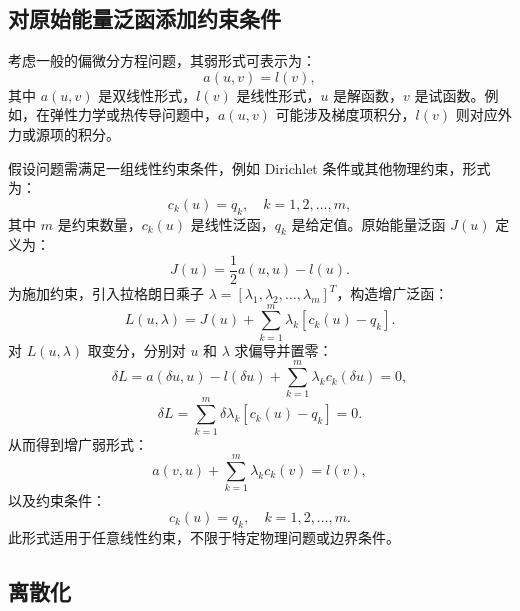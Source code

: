 \documentclass[engineeringmaster]{hquThesis}
\begin{document}
\subsection*{对原始能量泛函添加约束条件}

考虑一般的偏微分方程问题，其弱形式可表示为：
\begin{equation}
a(u, v) = l(v),
\label{eq:weak_form_general}
\end{equation}
其中 \( a(u, v) \) 是双线性形式，\( l(v) \) 是线性形式，\( u \) 是解函数，\( v \) 是试函数。例如，在弹性力学或热传导问题中，\( a(u, v) \) 可能涉及梯度项积分，\( l(v) \) 则对应外力或源项的积分。

假设问题需满足一组线性约束条件，例如 Dirichlet 条件或其他物理约束，形式为：
\begin{equation}
c_k(u) = q_k, \quad k = 1, 2, \ldots, m,
\label{eq:general_constraints}
\end{equation}
其中 \( m \) 是约束数量，\( c_k(u) \) 是线性泛函，\( q_k \) 是给定值。原始能量泛函 \( J(u) \) 定义为：
\begin{equation}
J(u) = \frac{1}{2} a(u, u) - l(u).
\label{eq:energy_functional_general}
\end{equation}
为施加约束，引入拉格朗日乘子 \( \lambda = [\lambda_1, \lambda_2, \ldots, \lambda_m]^T \)，构造增广泛函：
\begin{equation}
L(u, \lambda) = J(u) + \sum_{k=1}^m \lambda_k [c_k(u) - q_k].
\label{eq:lagrangian_general}
\end{equation}
对 \( L(u, \lambda) \) 取变分，分别对 \( u \) 和 \( \lambda \) 求偏导并置零：
\begin{equation}
\delta L = a(\delta u, u) - l(\delta u) + \sum_{k=1}^m \lambda_k c_k(\delta u) = 0,
\label{eq:variation_u_general}
\end{equation}
\begin{equation}
\delta L = \sum_{k=1}^m \delta \lambda_k [c_k(u) - q_k] = 0.
\label{eq:variation_lambda_general}
\end{equation}
从而得到增广弱形式：
\begin{equation}
a(v, u) + \sum_{k=1}^m \lambda_k c_k(v) = l(v),
\label{eq:augmented_weak_form_general}
\end{equation}
以及约束条件：
\begin{equation}
c_k(u) = q_k, \quad k = 1, 2, \ldots, m.
\label{eq:constraints_general}
\end{equation}
此形式适用于任意线性约束，不限于特定物理问题或边界条件。

\subsection*{离散化}
\end{document}
